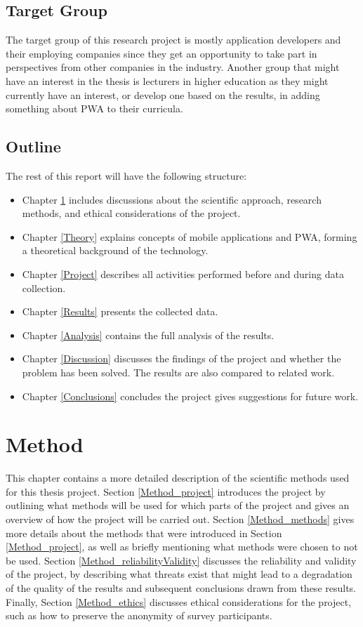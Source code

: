 \documentclass[a4paper,12pt]{article}
\begin{document}
\subsection{Target Group}
\label{Intro_targetGroup}
The target group of this research project is mostly application developers and their employing companies since they get an opportunity to take part in perspectives from other companies in the industry. Another group that might have an interest in the thesis is lecturers in higher education as they might currently have an interest, or develop one based on the results, in adding something about PWA to their curricula.

\subsection{Outline}
\label{Intro_outlin}
The rest of this report will have the following structure:
\begin{itemize}
    \item Chapter \ref{Method} includes discussions about the scientific approach, research methods, and ethical considerations of the project.
    \item Chapter \ref{Theory} explains concepts of mobile applications and PWA, forming a theoretical background of the technology.
    \item Chapter \ref{Project} describes all activities performed before and during data collection.
    \item Chapter \ref{Results} presents the collected data.
    \item Chapter \ref{Analysis} contains the full analysis of the results.
    \item Chapter \ref{Discussion} discusses the findings of the project and whether the problem has been solved. The results are also compared to related work.
    \item Chapter \ref{Conclusions} concludes the project gives suggestions for future work.
\end{itemize}

\newpage

\section{Method}
\label{Method}
This chapter contains a more detailed description of the scientific methods used for this thesis project. Section \ref{Method_project} introduces the project by outlining what methods will be used for which parts of the project and gives an overview of how the project will be carried out. Section \ref{Method_methods} gives more details about the methods that were introduced in Section \ref{Method_project}, as well as briefly mentioning what methods were chosen to not be used. Section \ref{Method_reliabilityValidity} discusses the reliability and validity of the project, by describing what threats exist that might lead to a degradation of the quality of the results and subsequent conclusions drawn from these results. Finally, Section \ref{Method_ethics} discusses ethical considerations for the project, such as how to preserve the anonymity of survey participants.
\end{document}
